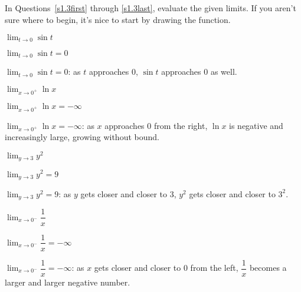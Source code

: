 \subsection*{\Procedural}
In Questions~\ref{s1.3first} through \ref{s1.3last}, evaluate the given limits. If you aren't sure where to begin, it's nice to start by drawing the function.

\begin{question}\label{s1.3first}
$\displaystyle\lim_{t \rightarrow 0} \sin t$
\end{question}
\begin{answer}
$\displaystyle\lim_{t \rightarrow 0} \sin t=0$
\end{answer}
\begin{solution}
$\displaystyle\lim_{t \rightarrow 0} \sin t=0$: as $t$ approaches 0, $\sin t$ approaches 0 as well.
\end{solution}

\begin{question}
$\displaystyle\lim_{x \rightarrow 0^+} \ln x$
\end{question}
\begin{answer}
$\displaystyle\lim_{x \rightarrow 0^+} \ln x = -\infty$
\end{answer}
\begin{solution}$\displaystyle\lim_{x \rightarrow 0^+} \ln x = -\infty$: as $x$ approaches 0 from the right, $\ln x$ is negative and increasingly large, growing without bound.
\end{solution}


\begin{question}
$\displaystyle\lim_{y \rightarrow 3} y^2$
\end{question}
\begin{answer}$\displaystyle\lim_{y \rightarrow 3} y^2=9$
\end{answer}
\begin{solution}
$\displaystyle\lim_{y \rightarrow 3} y^2=9$:
as $y$ gets closer and closer to 3, $y^2$ gets closer and closer to $3^2$.
\end{solution}


\begin{question}
$\displaystyle\lim_{x \rightarrow 0^-} \dfrac{1}{x}$
\end{question}
\begin{answer} $\displaystyle\lim_{x \rightarrow 0^-} \dfrac{1}{x}=-\infty$
\end{answer}
\begin{solution} $\displaystyle\lim_{x \rightarrow 0^-} \dfrac{1}{x}=-\infty$:
as $x$ gets closer and closer to 0 from the left, $\dfrac{1}{x}$ becomes a larger and larger negative number.
\end{solution}


